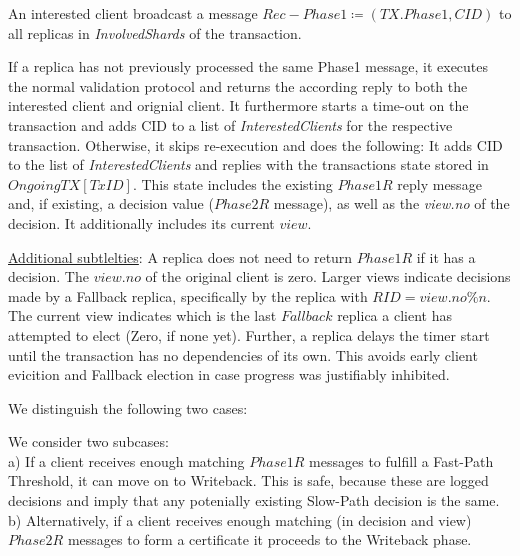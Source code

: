 An interested client broadcast a message $Rec-Phase1 \coloneqq (TX.Phase1, CID)$ to all replicas in \textit{InvolvedShards} of the transaction. 

If a replica has not previously processed the same Phase1 message, it executes the normal validation protocol and returns the according reply to both the interested client and orignial client. It furthermore starts a time-out on the transaction and adds CID to a list of \textit{InterestedClients} for the respective transaction.
Otherwise, it skips re-execution and does the following: It adds CID to the list of \textit{InterestedClients} and replies with the transactions state stored in $OngoingTX[TxID]$. This state includes the existing $Phase1R$ reply message and, if existing, a decision value ($Phase2R$ message), as well as the \textit{view.no} of the decision. It additionally includes its current $view$.

\underline{Additional subtlelties}: A replica does not need to return $Phase1R$ if it has a decision. The $view.no$ of the original client is zero. Larger views indicate decisions made by a Fallback replica, specifically by the replica with $RID = view.no \% n$. The current view indicates which is the last $Fallback$ replica a client has attempted to elect (Zero, if none yet). Further, a replica delays the timer start until the transaction has no dependencies of its own. This avoids early client evicition and Fallback election in case progress was justifiably inhibited. 


We distinguish the following two cases:

We consider two subcases:\\
a) If a client receives enough matching $Phase1R$ messages to fulfill a Fast-Path Threshold, it can move on to Writeback. This is safe, because these are logged decisions and imply that any potenially existing Slow-Path decision is the same.
b) Alternatively, if a client receives enough matching (in decision and view) $Phase2R$ messages to form a certificate it proceeds to the Writeback phase.\\


